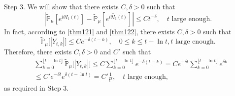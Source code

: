 \documentclass[12pt]{amsart}
\theoremstyle{plain}
\theoremstyle{definition}
\numberwithin{equation}{section}
\begin{document}
    Step 3. We will show that there exists $C, \delta> 0$ such that
\[
    |\mathbb{\tilde{P}}_{\mu}[e^{i\theta I_1(t)}] - \mathbb{\tilde{P}}_{\mu}[e^{i\theta\tilde{I}_1(t)}]|
    \leq C t^{-\delta}, 
    \quad t \text{ large enough}.
\]
    In fact, according to \eqref{thm121} and \eqref{thm122}, there exists $C,\delta > 0$ such that
\[
    \tilde{\mathbb P}_\mu\big[|Y_{t,k}|\big] 
    \leq C e^{-\delta(t-k)},
    \quad 0\leq k\leq t-\ln t, t\text{ large enough.}
\]
    Therefore, there exists $C, \delta > 0$ and $C'$ such that 
\begin{align}
    &\sum_{k=0}^{\lfloor t-\ln t \rfloor} \tilde {\mathbb P}_\mu\big[|Y_{t,k}|\big]
    \leq C\sum_{k=0}^{\lfloor t-\ln t \rfloor} e^{-\delta(t-k)}
    = C e^{-\delta t}\sum_{k=0}^{\lfloor t-\ln t \rfloor} e^{\delta k} 
    \\&\leq C' e^{-\delta t}e^{\delta (t-\ln t)} 
    = C'\frac{1}{t^{\delta}},
    \quad t \text{ large enough,}
\end{align}
    as required in Step 3.
\end{document}
